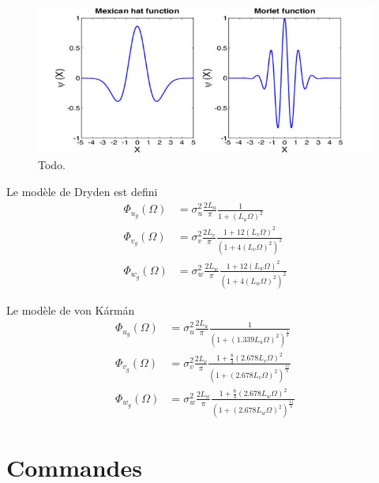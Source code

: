 \begin{figure}[ht!]
    \centerline{
    \includegraphics[trim=0cm 0cm 0cm 0cm,clip,width=0.8\columnwidth]{figures/Mexican-hat-and-Morlet-wavelet-functions_W640.jpg}}
    \caption{Todo.}
    \label{mexhat}
\end{figure}

Le modèle de Dryden est defini
\begin{subequations}
    \begin{align}
        \Phi _{u_{g}}(\Omega )& =\sigma _{u}^{2}{\frac {2L_{u}}{\pi }}{\frac {1}{1+(L_{u}\Omega )^{2}}}\\
        \Phi _{v_{g}}(\Omega )& =\sigma _{v}^{2}{\frac {2L_{v}}{\pi }}{\frac {1+12(L_{v}\Omega )^{2}}{\left(1+4(L_{v}\Omega )^{2}\right)^{2}}}\\
        \Phi _{w_{g}}(\Omega )& =\sigma _{w}^{2}{\frac {2L_{w}}{\pi }}{\frac {1+12(L_{w}\Omega )^{2}}{\left(1+4(L_{w}\Omega )^{2}\right)^{2}}}
    \end{align}
\end{subequations}

Le modèle de von Kármán
\begin{subequations}
    \begin{align}
        \Phi _{u_{g}}(\Omega )& =\sigma _{u}^{2}{\frac {2L_{u}}{\pi }}{\frac {1}{\left(1+(1.339L_{u}\Omega )^{2}\right)^{\frac {5}{6}}}}\\
        \Phi _{v_{g}}(\Omega )& =\sigma _{v}^{2}{\frac {2L_{v}}{\pi }}{\frac {1+{\frac {8}{3}}(2.678L_{v}\Omega )^{2}}{\left(1+(2.678L_{v}\Omega )^{2}\right)^{\frac {11}{6}}}}\\
        \Phi _{w_{g}}(\Omega )& =\sigma _{w}^{2}{\frac {2L_{w}}{\pi }}{\frac {1+{\frac {8}{3}}(2.678L_{w}\Omega )^{2}}{\left(1+(2.678L_{w}\Omega )^{2}\right)^{\frac {11}{6}}}}
    \end{align}
\end{subequations}


\section{Commandes}

